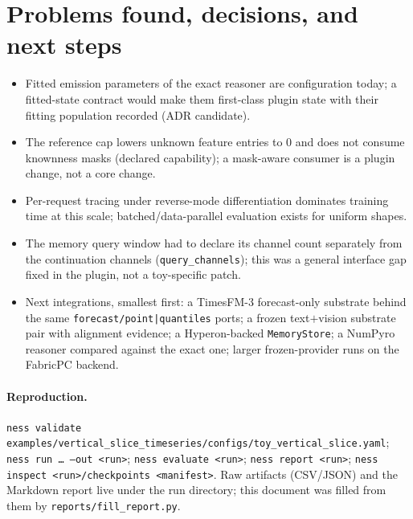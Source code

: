 \documentclass[10pt,a4paper]{article}
\newcommand{\code}[1]{\texttt{\small #1}}
\begin{document}
\section{Problems found, decisions, and next steps}
\begin{itemize}\setlength{\itemsep}{1pt}
\item Fitted emission parameters of the exact reasoner are configuration today; a fitted-state contract would make them first-class plugin state with their fitting population recorded (ADR candidate).
\item The reference cap lowers unknown feature entries to 0 and does not consume knownness masks (declared capability); a mask-aware consumer is a plugin change, not a core change.
\item Per-request tracing under reverse-mode differentiation dominates training time at this scale; batched/data-parallel evaluation exists for uniform shapes.
\item The memory query window had to declare its channel count separately from the continuation channels (\code{query\_channels}); this was a general interface gap fixed in the plugin, not a toy-specific patch.
\item Next integrations, smallest first: a TimesFM-3 forecast-only substrate behind the same \code{forecast/point|quantiles} ports; a frozen text$+$vision substrate pair with alignment evidence; a Hyperon-backed \code{MemoryStore}; a NumPyro reasoner compared against the exact one; larger frozen-provider runs on the FabricPC backend.
\end{itemize}
\paragraph{Reproduction.} \code{ness validate examples/vertical\_slice\_timeseries/configs/toy\_vertical\_slice.yaml}; \code{ness run \ldots\ --out <run>}; \code{ness evaluate <run>}; \code{ness report <run>}; \code{ness inspect <run>/checkpoints <manifest>}. Raw artifacts (CSV/JSON) and the Markdown report live under the run directory; this document was filled from them by \code{reports/fill\_report.py}.
\end{document}
